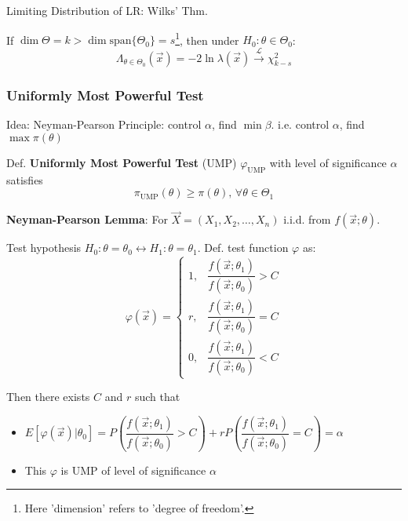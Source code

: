\begin{point}
    Limiting Distribution of LR: Wilks' Thm.
\end{point}

    

    
    If $\dim\Theta=k>\dim\mathrm{span}\{\Theta_0\}=s$\footnote{Here 'dimension' refers to 'degree of freedom'.}, then under $H_0:\theta\in\Theta_0$:
    \[
        \Lambda_{\theta\in\Theta_0}(\vec{x})=-2\ln \lambda(\vec{x})\xrightarrow[]{\mathscr{L}}\chi_{k-s}^2
    \]

\subsubsection{Uniformly Most Powerful Test}\label{SUbSectionUMP}
    Idea: Neyman-Pearson Principle: control $\alpha$, find $\min\beta$. i.e. control $\alpha$, find $\max\pi(\theta)$

    Def. \textbf{Uniformly Most Powerful Test} (UMP) $\varphi_{\mathrm{UMP}}$ with level of significance $\alpha$ satisfies
    \[
        \pi_{\mathrm{UMP}}(\theta)\geq\pi(\theta),\,\forall\theta\in\Theta_1
    \]

    \textbf{Neyman-Pearson Lemma}: For $\vec{X}=(X_1,X_2,\ldots,X_n)$ i.i.d. from $f(\vec{x};\theta)$. 
    
    Test hypothesis $H_0:\theta=\theta_0\longleftrightarrow H_1:\theta=\theta_1$. Def. test function $\varphi$ as:
    \begin{equation}\label{UMPtestfunction}
        \varphi(\vec{x})=\begin{cases}
            1,&\dfrac{f(\vec{x};\theta_1)}{f(\vec{x};\theta_0)}>C\\
            r,&\dfrac{f(\vec{x};\theta_1)}{f(\vec{x};\theta_0)}=C\\
            0,&\dfrac{f(\vec{x};\theta_1)}{f(\vec{x};\theta_0)}<C
        \end{cases}
    \end{equation}

    Then there exists $C$ and $r$ such that
    \begin{itemize}
        \item $E[\varphi(\vec{x})|\theta_0]=P(\dfrac{f(\vec{x};\theta_1)}{f(\vec{x};\theta_0)}>C)+rP(\dfrac{f(\vec{x};\theta_1)}{f(\vec{x};\theta_0)}=C)=\alpha$
        \item This $\varphi$ is UMP of level of significance $\alpha$
    \end{itemize}

